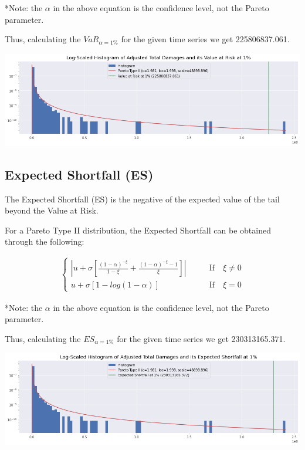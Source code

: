 \documentclass[paper=a4, fontsize=11pt]{scrartcl} %
\begin{document}
*Note: the $\alpha$ in the above equation is the confidence level, not the Pareto parameter.

Thus, calculating the $VaR_{\alpha=1\%}$ for the given time series we get 225806837.061.

\begin{center}
    \includegraphics[scale=0.5]{imgs/VaR.png}
\end{center}

\subsection{Expected Shortfall (ES)}

The Expected Shortfall (ES) is the negative of the expected value of the tail beyond the Value at Risk. 

For a Pareto Type II distribution, the Expected Shortfall can be obtained through the following:

\begin{align*}
    \begin{cases}
        \left| u + \sigma \left[\frac{(1-\alpha)^{-\xi}}{1-\xi} + \frac{(1-\alpha)^{-\xi}-1}{\xi}\right] \right| \qquad & \text{If} \quad \xi \neq 0  \\
        u + \sigma [1 - log(1-\alpha)] \qquad & \text{If} \quad \xi = 0
    \end{cases}
\end{align*}

*Note: the $\alpha$ in the above equation is the confidence level, not the Pareto parameter.

Thus, calculating the $ES_{\alpha=1\%}$ for the given time series we get 230313165.371.

\begin{center}
    \includegraphics[scale=0.5]{imgs/ES.png}
\end{center}
\end{document}
